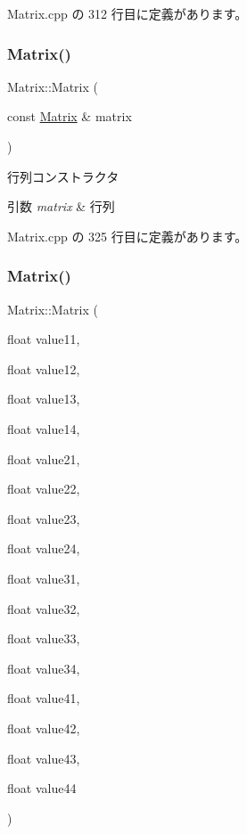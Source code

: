  Matrix.\+cpp の 312 行目に定義があります。

\mbox{\label{class_matrix_a2b1fedfb1b076d4ae504d2c61019871f}} 
\subsubsection{\texorpdfstring{Matrix()}{Matrix()}\hspace{0.1cm}{\footnotesize\ttfamily [4/5]}}
{\footnotesize\ttfamily Matrix\+::\+Matrix (\begin{DoxyParamCaption}\item[{const \mbox{\hyperlink{class_matrix}{Matrix}} \&}]{matrix }\end{DoxyParamCaption})}



行列コンストラクタ 


\begin{DoxyParams}{引数}
{\em matrix} & 行列 \\
\hline
\end{DoxyParams}


 Matrix.\+cpp の 325 行目に定義があります。

\mbox{\label{class_matrix_a3f698b5ae393f6f8395c323e4701686c}} 
\subsubsection{\texorpdfstring{Matrix()}{Matrix()}\hspace{0.1cm}{\footnotesize\ttfamily [5/5]}}
{\footnotesize\ttfamily Matrix\+::\+Matrix (\begin{DoxyParamCaption}\item[{float}]{value11,  }\item[{float}]{value12,  }\item[{float}]{value13,  }\item[{float}]{value14,  }\item[{float}]{value21,  }\item[{float}]{value22,  }\item[{float}]{value23,  }\item[{float}]{value24,  }\item[{float}]{value31,  }\item[{float}]{value32,  }\item[{float}]{value33,  }\item[{float}]{value34,  }\item[{float}]{value41,  }\item[{float}]{value42,  }\item[{float}]{value43,  }\item[{float}]{value44 }\end{DoxyParamCaption})}



